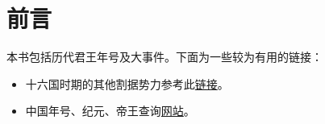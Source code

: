 
\chapter{前言}

本书包括历代君王年号及大事件。下面为一些较为有用的链接：

\begin{itemize}
  \small \kaiti
  \item 十六国时期的其他割据势力参考此\href{https://zh.wikipedia.org/wiki/%E4%BA%94%E8%83%A1%E5%8D%81%E5%85%AD%E5%9B%BD#%E5%85%B6%E4%BB%96}{链接}。
  \item 中国年号、纪元、帝王查询\href{http://www.chinese-artists.net/year/}{网站}。
\end{itemize}

